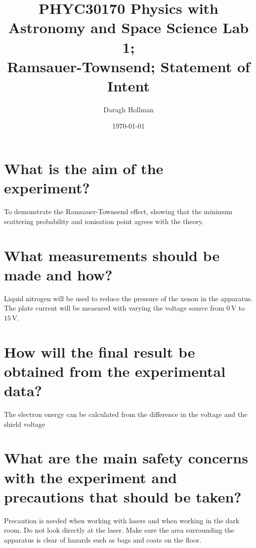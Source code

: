 \documentclass[%
reprint,
amsmath,amssymb,
aps,
]{revtex4-2}
\begin{document}
	\title{PHYC30170 Physics with Astronomy and Space Science Lab 1;\\
	Ramsauer-Townsend; Statement of Intent}
	
	\author{Daragh Hollman}
	
	\date{\today}
	
	\maketitle
	
	\onecolumngrid
	\section{What is the aim of the experiment?}
		To demonstrate the Ramsauer-Townsend effect, showing that the minimum scattering probability and ionisation point agrees with the theory.
	
	\section{What measurements should be made and how?}
		Liquid nitrogen will be used to reduce the pressure of the xenon in the apparatus. The plate current will be measured  with varying the voltage source from $0 \,\text{V}$ to $15 \,\text{V}$.
	
	\section{How will the final result be obtained from the experimental data?}
		The electron energy can be calculated from the difference in the voltage and the shield voltage
	
	\section{What are the main safety concerns with the experiment and precautions that should be taken?}
		Precaution is needed when working with lasers and when working in the dark room. Do not look directly at the laser. Make sure the area surrounding the apparatus is clear of hazards such as bags and coats on the floor.
	
\end{document}
